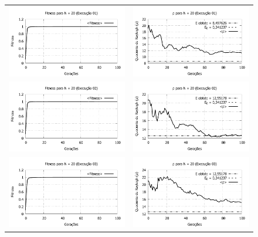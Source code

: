 \begin{figure}[phtb]
\centering
  \begin{tabular}{@{}cc@{}}
    \includegraphics[width=.40\textwidth]{figs/resultados/N20_01_fitness.pdf} &
    \includegraphics[width=.40\textwidth]{figs/resultados/N20_01_rho.pdf}   \\
		\includegraphics[width=.40\textwidth]{figs/resultados/N20_02_fitness.pdf} &
    \includegraphics[width=.40\textwidth]{figs/resultados/N20_02_rho.pdf}   \\
		\includegraphics[width=.40\textwidth]{figs/resultados/N20_03_fitness.pdf} &
    \includegraphics[width=.40\textwidth]{figs/resultados/N20_03_rho.pdf}   \\

\end{tabular}
\end{figure}
